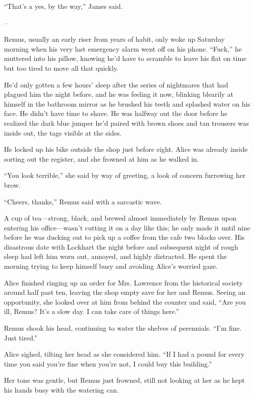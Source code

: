 “That’s a yes, by the way,” James said.

--

Remus, usually an early riser from years of habit, only woke up Saturday morning when his very last emergency alarm went off on his phone. “Fuck,” he muttered into his pillow, knowing he’d have to scramble to leave his flat on time but too tired to move all that quickly.

He’d only gotten a few hours’ sleep after the series of nightmares that had plagued him the night before, and he was feeling it now, blinking blearily at himself in the bathroom mirror as he brushed his teeth and splashed water on his face. He didn’t have time to shave. He was halfway out the door before he realized the dark blue jumper he’d paired with brown shoes and tan trousers was inside out, the tags visible at the sides.

He locked up his bike outside the shop just before eight. Alice was already inside sorting out the register, and she frowned at him as he walked in.

“You look terrible,” she said by way of greeting, a look of concern furrowing her brow.

“Cheers, thanks,” Remus said with a sarcastic wave.

A cup of tea—strong, black, and brewed almost immediately by Remus upon entering his office—wasn’t cutting it on a day like this; he only made it until nine before he was ducking out to pick up a coffee from the cafe two blocks over. His disastrous date with Lockhart the night before and subsequent night of rough sleep had left him worn out, annoyed, and highly distracted. He spent the morning trying to keep himself busy and avoiding Alice’s worried gaze.

Alice finished ringing up an order for Mrs. Lawrence from the historical society around half past ten, leaving the shop empty save for her and Remus. Seeing an opportunity, she looked over at him from behind the counter and said, “Are you ill, Remus? It’s a slow day. I can take care of things here.”

Remus shook his head, continuing to water the shelves of perennials. “I’m fine. Just tired.”

Alice sighed, tilting her head as she considered him. “If I had a pound for every time you said you’re fine when you’re not, I could buy this building.”

Her tone was gentle, but Remus just frowned, still not looking at her as he kept his hands busy with the watering can.

